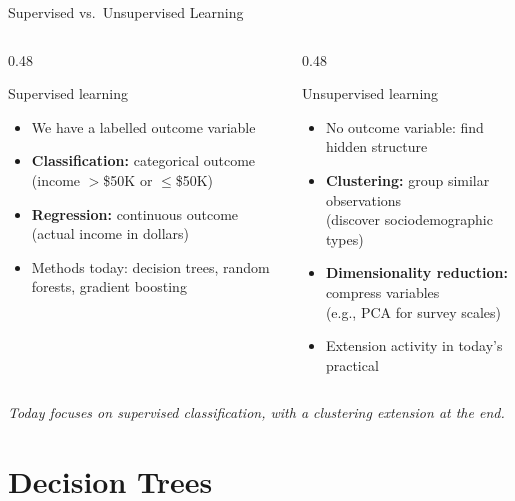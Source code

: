 \documentclass[aspectratio=169, 10pt]{beamer}
\begin{document}
\begin{frame}{Supervised vs.\ Unsupervised Learning}

\begin{columns}[T]
\begin{column}{0.48\textwidth}
\begin{block}{Supervised learning}
\begin{itemize}
  \setlength\itemsep{0.4em}
  \item We have a labelled outcome variable
  \item \textbf{Classification:} categorical outcome\\
    \small (income $>$\$50K or $\leq$\$50K)
  \item \textbf{Regression:} continuous outcome\\
    \small (actual income in dollars)
  \item Methods today: decision trees, random forests, gradient boosting
\end{itemize}
\end{block}
\end{column}
\begin{column}{0.48\textwidth}
\begin{block}{Unsupervised learning}
\begin{itemize}
  \setlength\itemsep{0.4em}
  \item No outcome variable: find hidden structure
  \item \textbf{Clustering:} group similar observations\\
    \small (discover sociodemographic types)
  \item \textbf{Dimensionality reduction:} compress variables\\
    \small (e.g., PCA for survey scales)
  \item Extension activity in today's practical
\end{itemize}
\end{block}
\end{column}
\end{columns}

\vspace{0.9em}
\centering
\small\textit{Today focuses on supervised classification, with a clustering extension at the end.}

\end{frame}

\section{Decision Trees}
\end{document}
